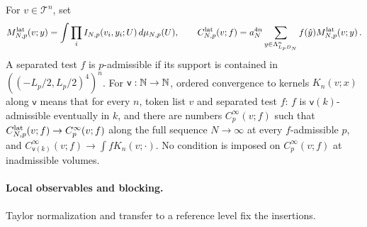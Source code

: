 \begin{definition}\label{def:ordered-convergence}
For $v\in\mathcal T^n$, set
\begin{equation}\label{eq:lattice-moments}
M^{\mathrm{lat}}_{N,p}(v;y)=\int\prod_iI_{N,p}(v_i,y_i;U)\,d\mu_{N,p}(U),\qquad C^{\mathrm{lat}}_{N,p}(v;f)=a_N^{4n}\sum_{y\in\Lambda_{L_pD_N}^n}f(\hat y)M^{\mathrm{lat}}_{N,p}(v;y)\,.
\end{equation}
A separated test $f$ is $p$-admissible if its support is contained in $((-L_p/2,L_p/2)^4)^n$. For $\mathsf v:\mathbb{N}\to\mathbb{N}$, ordered convergence to kernels $K_n(v;x)$ along $\mathsf v$ means that for every $n$, token list $v$ and separated test $f$: $f$ is $\mathsf v(k)$-admissible eventually in $k$, and there are numbers $C_p^\infty(v;f)$ such that $C^{\mathrm{lat}}_{N,p}(v;f)\to C_p^\infty(v;f)$ along the full sequence $N\to\infty$ at every $f$-admissible $p$, and $C_{\mathsf v(k)}^\infty(v;f)\to\int fK_n(v;\cdot)$. No condition is imposed on $C_p^\infty(v;f)$ at inadmissible volumes.
\end{definition}

\paragraph{Local observables and blocking.} Taylor normalization and transfer to a reference level fix the insertions.

